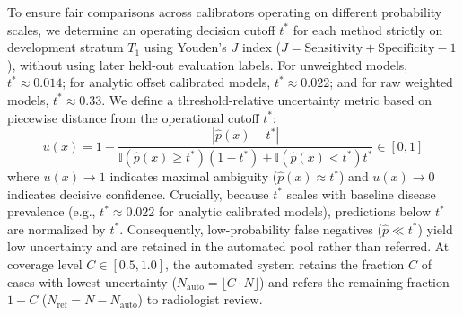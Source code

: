 \documentclass[preprint,12pt]{elsarticle}
\begin{document}
To ensure fair comparisons across calibrators operating on different probability scales, we determine an operating decision cutoff $t^*$ for each method strictly on development stratum $T_1$ using Youden's $J$ index ($J = \text{Sensitivity} + \text{Specificity} - 1$), without using later held-out evaluation labels. For unweighted models, $t^* \approx 0.014$; for analytic offset calibrated models, $t^* \approx 0.022$; and for raw weighted models, $t^* \approx 0.33$. We define a threshold-relative uncertainty metric based on piecewise distance from the operational cutoff $t^*$:
\begin{equation}
u(x) = 1 - \frac{|\hat{p}(x) - t^*|}{\mathbb{I}(\hat{p}(x) \ge t^*)(1 - t^*) + \mathbb{I}(\hat{p}(x) < t^*)t^*} \in [0, 1]
\label{eq:uncertainty}
\end{equation}
where $u(x) \to 1$ indicates maximal ambiguity ($\hat{p}(x) \approx t^*$) and $u(x) \to 0$ indicates decisive confidence. Crucially, because $t^*$ scales with baseline disease prevalence (e.g., $t^* \approx 0.022$ for analytic calibrated models), predictions below $t^*$ are normalized by $t^*$. Consequently, low-probability false negatives ($\hat{p} \ll t^*$) yield low uncertainty and are retained in the automated pool rather than referred. At coverage level $C \in [0.5, 1.0]$, the automated system retains the fraction $C$ of cases with lowest uncertainty ($N_{\text{auto}} = \lfloor C \cdot N \rfloor$) and refers the remaining fraction $1 - C$ ($N_{\text{ref}} = N - N_{\text{auto}}$) to radiologist review.
\end{document}
